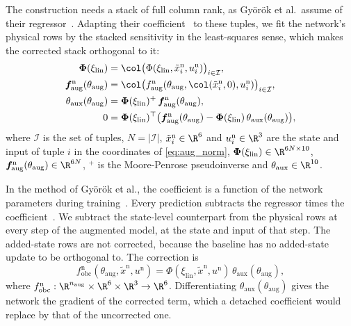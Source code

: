 The construction needs a stack of full column rank, as Gy\"or\"ok et al.\
assume of their regressor~\cite[Assumption~1]{gyorok2026obc}.
Adapting their coefficient~\cite[Eqs.~(8), (11), Lemma~3]{gyorok2026obc} to
these tuples, we fit the network's physical rows by the stacked sensitivity in
the least-squares sense, which makes the corrected stack orthogonal to it:
\begin{equation}
\begin{aligned}
 \boldsymbol\Phi(\xi_{\mathrm{lin}})
 &=\col\bigl(\Phi(\xi_{\mathrm{lin}},\tilde x^{\mathrm n}_i,u^{\mathrm n}_i)\bigr)_{i\in\mathcal I},\\
 \boldsymbol f^{\mathrm n}_{\mathrm{aug}}(\theta_{\mathrm{aug}})
 &=\col\bigl(f^{\mathrm n}_{\mathrm{aug}}(\theta_{\mathrm{aug}},\col(\tilde x^{\mathrm n}_i,0),u^{\mathrm n}_i)\bigr)_{i\in\mathcal I},\\
 \theta_{\mathrm{aux}}(\theta_{\mathrm{aug}})
 &=\boldsymbol\Phi(\xi_{\mathrm{lin}})^{+}\,\boldsymbol f^{\mathrm n}_{\mathrm{aug}}(\theta_{\mathrm{aug}}),\\
 0&=\boldsymbol\Phi(\xi_{\mathrm{lin}})^{\top}
   \bigl(\boldsymbol f^{\mathrm n}_{\mathrm{aug}}(\theta_{\mathrm{aug}})
   -\boldsymbol\Phi(\xi_{\mathrm{lin}})\,\theta_{\mathrm{aux}}(\theta_{\mathrm{aug}})\bigr),
\end{aligned}
\label{eq:obc_coef}
\end{equation}
where $\mathcal I$ is the set of tuples, $N=|\mathcal I|$,
$\tilde x^{\mathrm n}_i\in\R^6$ and $u^{\mathrm n}_i\in\R^3$ are the state and
input of tuple $i$ in the coordinates of \eqref{eq:aug_norm},
$\boldsymbol\Phi(\xi_{\mathrm{lin}})\in\R^{6N\times10}$,
$\boldsymbol f^{\mathrm n}_{\mathrm{aug}}(\theta_{\mathrm{aug}})\in\R^{6N}$,
${}^{+}$ is the Moore-Penrose pseudoinverse and
$\theta_{\mathrm{aux}}\in\R^{10}$.

In the method of Gy\"or\"ok et al., the coefficient is a function of the
network parameters during training~\cite[Eq.~(9)]{gyorok2026obc}.
Every prediction subtracts the regressor times the
coefficient~\cite[Eq.~(13)]{gyorok2026obc}.
We subtract the state-level counterpart from the physical rows at every step
of the augmented model, at the state and input of that step.
The added-state rows are not corrected, because the baseline has no
added-state update to be orthogonal to.
The correction is
\begin{equation}
 f^{\mathrm n}_{\mathrm{obc}}(\theta_{\mathrm{aug}},\tilde x^{\mathrm n},u^{\mathrm n})
 =\Phi(\xi_{\mathrm{lin}},\tilde x^{\mathrm n},u^{\mathrm n})\,
  \theta_{\mathrm{aux}}(\theta_{\mathrm{aug}}),
\label{eq:obc_corr}
\end{equation}
where
$f^{\mathrm n}_{\mathrm{obc}}:\R^{n_{\mathrm{aug}}}\times\R^6\times\R^3\to\R^6$.
Differentiating $\theta_{\mathrm{aux}}(\theta_{\mathrm{aug}})$ gives the
network the gradient of the corrected term, which a detached coefficient would
replace by that of the uncorrected one.

